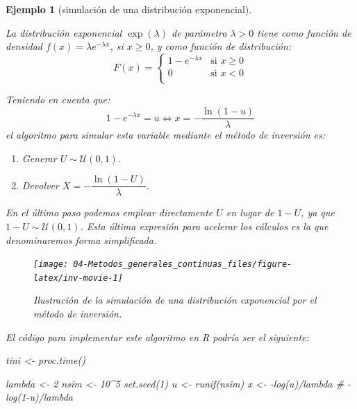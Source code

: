 \documentclass[
]{book}
\newenvironment{Shaded}{\begin{snugshade}}{\end{snugshade}}
\newcommand{\CommentTok}[1]{\textcolor[rgb]{0.56,0.35,0.01}{\textit{#1}}}
\newcommand{\DecValTok}[1]{\textcolor[rgb]{0.00,0.00,0.81}{#1}}
\newcommand{\FunctionTok}[1]{\textcolor[rgb]{0.00,0.00,0.00}{#1}}
\newcommand{\NormalTok}[1]{#1}
\newcommand{\OtherTok}[1]{\textcolor[rgb]{0.56,0.35,0.01}{#1}}
\newcommand{\SpecialCharTok}[1]{\textcolor[rgb]{0.00,0.00,0.00}{#1}}
\theoremstyle{break}
\newtheorem{example}{Ejemplo}[chapter]
\theoremstyle{nonumberplain}
\begin{document}
\begin{example}[simulación de una distribución exponencial]
\protect\hypertarget{exm:exp-inv}{}\label{exm:exp-inv}

La distribución exponencial \(\exp \left( \lambda \right)\) de parámetro \(\lambda>0\)
tiene como función de densidad \(f(x) =\lambda e^{-\lambda x}\), si \(x\geq 0\),
y como función de distribución:
\[F(x)=\left\{ \begin{array}{ll}
1-e^{-\lambda x} & \text{si } x \ge 0 \\
0 & \text{si } x < 0\\
\end{array} \right.\]

Teniendo en cuenta que:
\[1-e^{-\lambda x}=u \Leftrightarrow x=-\frac{\ln \left( 1-u\right) }{ \lambda }\]
el algoritmo para simular esta variable mediante el método de inversión es:

\begin{enumerate}
\def\labelenumi{\arabic{enumi}.}
\item
  Generar \(U \sim \mathcal{U}(0, 1)\).
\item
  Devolver \(X=-\dfrac{\ln \left( 1-U\right) }{\lambda }\).
\end{enumerate}

En el último paso podemos emplear directamente \(U\) en lugar de \(1-U\), ya que \(1 - U \sim \mathcal{U}(0, 1)\).
Esta última expresión para acelerar los cálculos es la que denominaremos \emph{forma simplificada}.

\begin{figure}[!htb]

{\centering \texttt{[image: 04-Metodos\_generales\_continuas\_files/figure-latex/inv-movie-1]} 

}

\caption{Ilustración de la simulación de una distribución exponencial por el método de inversión.}\label{fig:inv-movie}
\end{figure}

El código para implementar este algoritmo en R podría ser el siguiente:

\begin{Shaded}
\begin{Highlighting}[]
\NormalTok{tini }\OtherTok{\textless{}{-}} \FunctionTok{proc.time}\NormalTok{()}

\NormalTok{lambda }\OtherTok{\textless{}{-}} \DecValTok{2}
\NormalTok{nsim }\OtherTok{\textless{}{-}} \DecValTok{10}\SpecialCharTok{\^{}}\DecValTok{5}
\FunctionTok{set.seed}\NormalTok{(}\DecValTok{1}\NormalTok{)}
\NormalTok{u }\OtherTok{\textless{}{-}} \FunctionTok{runif}\NormalTok{(nsim)}
\NormalTok{x }\OtherTok{\textless{}{-}} \SpecialCharTok{{-}}\FunctionTok{log}\NormalTok{(u)}\SpecialCharTok{/}\NormalTok{lambda }\CommentTok{\# {-}log(1{-}u)/lambda}


\end{Highlighting}
\end{Shaded}
\end{example}
\end{document}
